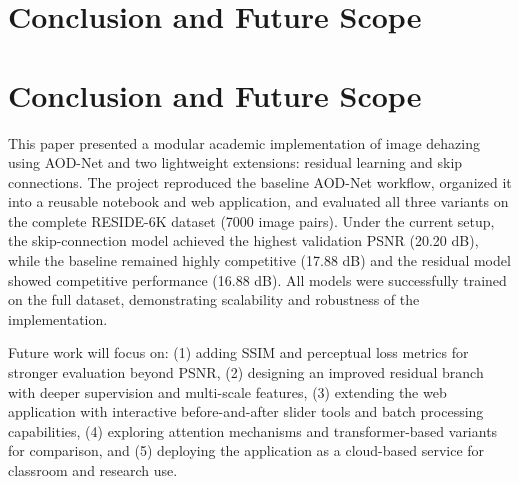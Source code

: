 \documentclass[conference]{IEEEtran}
\begin{document}
\section{Conclusion and Future Scope}
\section{Conclusion and Future Scope}
This paper presented a modular academic implementation of image dehazing using AOD-Net and two lightweight extensions: residual learning and skip connections. The project reproduced the baseline AOD-Net workflow, organized it into a reusable notebook and web application, and evaluated all three variants on the complete RESIDE-6K dataset (7000 image pairs). Under the current setup, the skip-connection model achieved the highest validation PSNR (20.20 dB), while the baseline remained highly competitive (17.88 dB) and the residual model showed competitive performance (16.88 dB). All models were successfully trained on the full dataset, demonstrating scalability and robustness of the implementation.

Future work will focus on: (1) adding SSIM and perceptual loss metrics for stronger evaluation beyond PSNR, (2) designing an improved residual branch with deeper supervision and multi-scale features, (3) extending the web application with interactive before-and-after slider tools and batch processing capabilities, (4) exploring attention mechanisms and transformer-based variants for comparison, and (5) deploying the application as a cloud-based service for classroom and research use.



\end{document}
